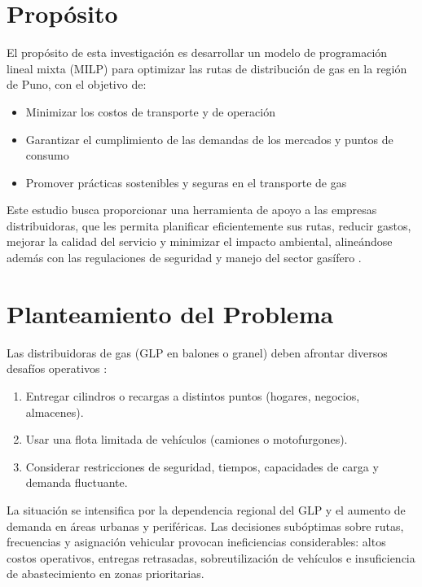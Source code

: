 \documentclass[11pt, a4paper]{article}
\begin{document}
\section{Propósito}
El propósito de esta investigación es desarrollar un modelo de programación lineal mixta (MILP) para optimizar las rutas de distribución de gas en la región de Puno, con el objetivo de:

\begin{itemize}[leftmargin=*]
    \item Minimizar los costos de transporte y de operación
    \item Garantizar el cumplimiento de las demandas de los mercados y puntos de consumo
    \item Promover prácticas sostenibles y seguras en el transporte de gas
\end{itemize}

Este estudio busca proporcionar una herramienta de apoyo a las empresas distribuidoras, que les permita planificar eficientemente sus rutas, reducir gastos, mejorar la calidad del servicio y minimizar el impacto ambiental, alineándose además con las regulaciones de seguridad y manejo del sector gasífero \citep{OrozcoGutierrez2018}.

\section{Planteamiento del Problema}
Las distribuidoras de gas (GLP en balones o granel) deben afrontar diversos desafíos operativos \citep{Cornejo2018}:

\begin{enumerate}[label=\arabic*., leftmargin=*]
    \item Entregar cilindros o recargas a distintos puntos (hogares, negocios, almacenes).
    \item Usar una flota limitada de vehículos (camiones o motofurgones).
    \item Considerar restricciones de seguridad, tiempos, capacidades de carga y demanda fluctuante.
\end{enumerate}

La situación se intensifica por la dependencia regional del GLP y el aumento de demanda en áreas urbanas y periféricas. Las decisiones subóptimas sobre rutas, frecuencias y asignación vehicular provocan ineficiencias considerables: altos costos operativos, entregas retrasadas, sobreutilización de vehículos e insuficiencia de abastecimiento en zonas prioritarias.
\end{document}

